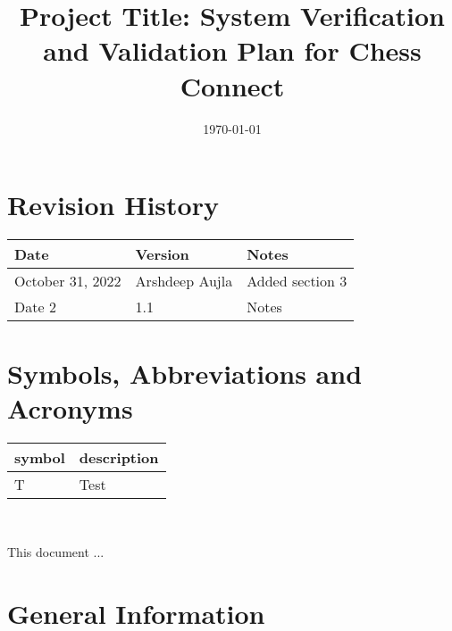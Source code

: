 \documentclass[12pt, titlepage]{article}
\begin{document}
\title{Project Title: System Verification and Validation Plan for Chess Connect} 
\author{\authname}
\date{\today}
	
\maketitle


\section{Revision History}

\begin{tabularx}{\textwidth}{p{3cm}p{2cm}X}
\toprule {\bf Date} & {\bf Version} & {\bf Notes}\\
\midrule
October 31, 2022 & Arshdeep Aujla & Added section 3\\
Date 2 & 1.1 & Notes\\
\bottomrule
\end{tabularx}

\newpage

\tableofcontents

\listoftables
{}

\listoffigures
{}

\newpage

\section{Symbols, Abbreviations and Acronyms}

\renewcommand{\arraystretch}{1.2}
\begin{tabular}{l l} 
  \toprule		
  \textbf{symbol} & \textbf{description}\\
  \midrule 
  T & Test\\
  \bottomrule
\end{tabular}\\


\newpage


This document ... 

\section{General Information}
\end{document}
